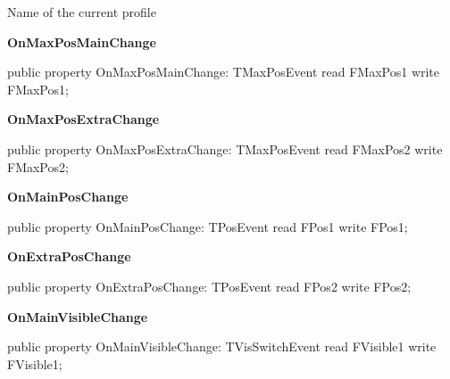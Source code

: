 \documentclass{report}
\newif\ifpdf
\begin{document}
\begin{list}{}
\begin{flushleft}
\ifpdf
\end{flushleft}
\fi


\par Name of the current profile\label{ipkhandle.TInstallation-OnMaxPosMainChange}
\item[\textbf{OnMaxPosMainChange}\hfill]
\ifpdf
\begin{flushleft}
\fi
\begin{ttfamily}
public property OnMaxPosMainChange: TMaxPosEvent read FMaxPos1 write FMaxPos1;\end{ttfamily}

\ifpdf
\end{flushleft}
\fi


\par  \label{ipkhandle.TInstallation-OnMaxPosExtraChange}
\item[\textbf{OnMaxPosExtraChange}\hfill]
\ifpdf
\begin{flushleft}
\fi
\begin{ttfamily}
public property OnMaxPosExtraChange: TMaxPosEvent read FMaxPos2 write FMaxPos2;\end{ttfamily}

\ifpdf
\end{flushleft}
\fi


\par  \label{ipkhandle.TInstallation-OnMainPosChange}
\item[\textbf{OnMainPosChange}\hfill]
\ifpdf
\begin{flushleft}
\fi
\begin{ttfamily}
public property OnMainPosChange: TPosEvent read FPos1 write FPos1;\end{ttfamily}

\ifpdf
\end{flushleft}
\fi


\par  \label{ipkhandle.TInstallation-OnExtraPosChange}
\item[\textbf{OnExtraPosChange}\hfill]
\ifpdf
\begin{flushleft}
\fi
\begin{ttfamily}
public property OnExtraPosChange: TPosEvent read FPos2 write FPos2;\end{ttfamily}

\ifpdf
\end{flushleft}
\fi


\par  \label{ipkhandle.TInstallation-OnMainVisibleChange}
\item[\textbf{OnMainVisibleChange}\hfill]
\ifpdf
\begin{flushleft}
\fi
\begin{ttfamily}
public property OnMainVisibleChange: TVisSwitchEvent read FVisible1 write FVisible1;\end{ttfamily}


\end{flushleft}
\end{list}
\end{document}
